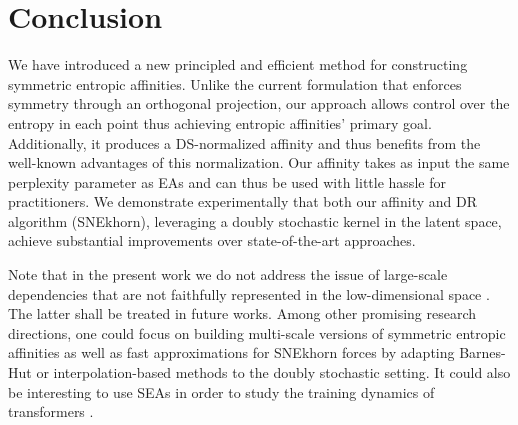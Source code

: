 
\section{Conclusion}\label{sec:conclusion}

We have introduced a new principled and efficient method for constructing symmetric entropic affinities. Unlike the current formulation that enforces symmetry through an orthogonal projection, our approach allows control over the entropy in each point thus achieving entropic affinities' primary goal. Additionally, it produces a DS-normalized affinity and thus benefits from the well-known advantages of this normalization. Our affinity takes as input the same perplexity parameter as EAs and can thus be used with little hassle for practitioners. We demonstrate experimentally that both our affinity and DR algorithm (SNEkhorn), leveraging a doubly stochastic kernel in the latent space, achieve substantial improvements over state-of-the-art approaches.

Note that in the present work we do not address the issue of large-scale dependencies that are not faithfully represented in the low-dimensional space \cite{van2022probabilistic}. The latter shall be treated in future works. 
Among other promising research directions, one could focus on building multi-scale versions of symmetric entropic affinities \cite{lee2015multi} as well as fast approximations for SNEkhorn forces by adapting \eg Barnes-Hut \cite{van2013barnes} or interpolation-based methods \cite{linderman2019fast} to the doubly stochastic setting. It could also be interesting to use SEAs in order to study the training dynamics of transformers \cite{zhai2023sigmareparam}.